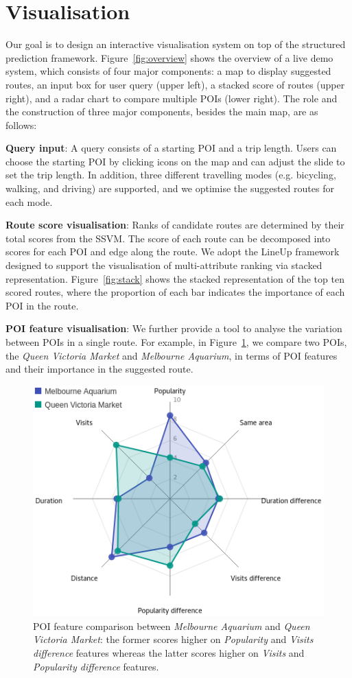 \section{Visualisation}
Our goal is to design an interactive visualisation system on top of the structured prediction framework.
Figure~\ref{fig:overview} shows the overview of a live demo system, which consists of four major components: a map to display suggested routes, an input box for user query (upper left), a stacked score of routes (upper right), and a radar chart to compare multiple POIs (lower right). 
The role and the construction of three major components, besides the main map, are as follows:

\textbf{Query input}: A query consists of a starting POI and a trip length. 
Users can choose the starting POI by clicking icons on the map and can adjust the slide to set the trip length. 
In addition, three different travelling modes (e.g. bicycling, walking, and driving) are supported, 
and we optimise the suggested routes for each mode.

\textbf{Route score visualisation}: Ranks of candidate routes are determined by their total scores from the SSVM. 
The score of each route can be decomposed into scores for each POI and edge along the route. 
We adopt the LineUp framework~\cite{gratzl2013lineup} designed to support the visualisation of multi-attribute ranking via stacked representation. 
Figure~\ref{fig:stack} shows the stacked representation of the top ten scored routes, where the proportion of each bar indicates the importance of each POI in the route.

\textbf{POI feature visualisation}: We further provide a tool to analyse the variation between POIs in a single route. 
        For example, in Figure~\ref{fig:radar}, we compare two POIs, the \textit{Queen Victoria Market} and \textit{Melbourne Aquarium}, in terms of POI features and their importance in the suggested route. 

\begin{figure}[t!]
\includegraphics[width=0.6\linewidth]{figure/sample_radar.png}
    \caption{POI feature comparison between \textit{Melbourne Aquarium} and \textit{Queen Victoria Market}: the former scores higher on \textit{Popularity} and \textit{Visits difference} features whereas the latter scores higher on \textit{Visits} and \textit{Popularity difference} features.}
\label{fig:radar} \vspace{-1em}
\end{figure}
